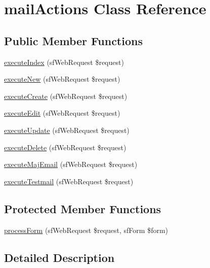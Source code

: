 \hypertarget{classmail_actions}{\section{mail\-Actions Class Reference}
\label{classmail_actions}
}
\subsection*{Public Member Functions}
\begin{DoxyCompactItemize}
\item 
\hyperlink{classmail_actions_a948cc911eb1d9f77990be54af3b2080f}{execute\-Index} (sf\-Web\-Request \$request)
\item 
\hyperlink{classmail_actions_a0ffbea56560c6c633dae68ec22aff21c}{execute\-New} (sf\-Web\-Request \$request)
\item 
\hyperlink{classmail_actions_a75837617743fb64dca82d8133b2c662a}{execute\-Create} (sf\-Web\-Request \$request)
\item 
\hyperlink{classmail_actions_af4d8fedd4b28f3398826a1bb8fa54394}{execute\-Edit} (sf\-Web\-Request \$request)
\item 
\hyperlink{classmail_actions_af7b4f51862add3c2ebb54efc136a0840}{execute\-Update} (sf\-Web\-Request \$request)
\item 
\hyperlink{classmail_actions_a52b5b11b11a0070dd2662257520c045a}{execute\-Delete} (sf\-Web\-Request \$request)
\item 
\hyperlink{classmail_actions_aeab42761e0e9f107da6aefc5c6736cb6}{execute\-Maj\-Email} (sf\-Web\-Request \$request)
\item 
\hyperlink{classmail_actions_aaa70004b5da167f6c4ac02522f9544f6}{execute\-Testmail} (sf\-Web\-Request \$request)
\end{DoxyCompactItemize}
\subsection*{Protected Member Functions}
\begin{DoxyCompactItemize}
\item 
\hyperlink{classmail_actions_a7cf661d837626e0320753cbffa019a01}{process\-Form} (sf\-Web\-Request \$request, sf\-Form \$form)
\end{DoxyCompactItemize}


\subsection{Detailed Description}


